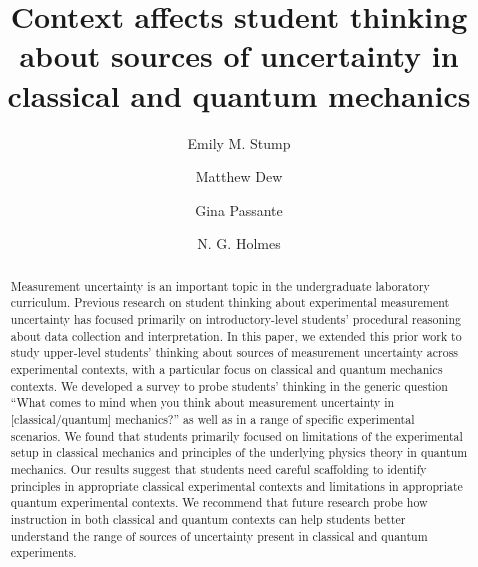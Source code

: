 \documentclass[english,aps,prstper,reprint,showpacs,longbibliography,superscriptaddress,nofootinbib]{revtex4-2}
\begin{document}
\begin{titlepage}

  
  \title{Context affects student thinking about sources of uncertainty in classical and quantum mechanics}

  \author{Emily M. Stump}
  \author{Matthew Dew}
  \author{Gina Passante}
   \author{N. G. Holmes}


  \begin{abstract}
    Measurement uncertainty is an important topic in the undergraduate laboratory curriculum. Previous research on student thinking about experimental measurement uncertainty has focused primarily on introductory-level students' procedural reasoning about data collection and interpretation. In this paper, we extended this prior work to study upper-level students' thinking about sources of measurement uncertainty across experimental contexts, with a particular focus on classical and quantum mechanics contexts. We developed a survey to probe students' thinking in the generic question ``What comes to mind when you think about measurement uncertainty in [classical/quantum] mechanics?'' as well as in a range of specific experimental scenarios. We found that students primarily focused on limitations of the experimental setup in classical mechanics and principles of the underlying physics theory in quantum mechanics. Our results suggest that students need careful scaffolding to identify principles in appropriate classical experimental contexts and limitations in appropriate quantum experimental contexts. We recommend that future research probe how instruction in both classical and quantum contexts can help students better understand the range of sources of uncertainty present in classical and quantum experiments.
  \end{abstract}
  
  \maketitle
\end{titlepage}
\end{document}
